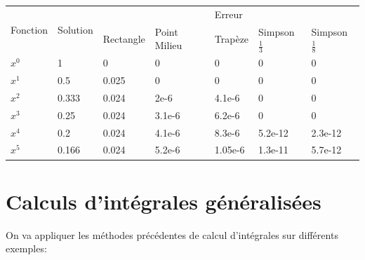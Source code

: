 \documentclass[a4paper,10pt]{article}
\begin{document}
\begin{enumerate}
{\begin{center}
\begin{tabular}{|l|l|l|l|l|l|l|}
\multirow{2}{*}{Fonction} & \multirow{2}{*}{Solution} & \multicolumn{5}{c|}{Erreur} \\\cline{3-7}
      &         & Rectangle & Point Milieu & Trapèze & Simpson $\frac{1}{3}$ & Simpson $\frac{1}{8}$\\\hline
$x^0$ & 1       & 0         & 0            & 0       & 0                    & 0 \\\hline
$x^1$ & 0.5     & 0.025     & 0            & 0       & 0                    & 0 \\\hline
$x^2$ & 0.333   & 0.024     & 2e-6         & 4.1e-6  & 0                    & 0 \\\hline
$x^3$ & 0.25    & 0.024     & 3.1e-6       & 6.2e-6  & 0                    & 0 \\\hline
$x^4$ & 0.2     & 0.024     & 4.1e-6       & 8.3e-6  & 5.2e-12              & 2.3e-12 \\\hline
$x^5$ & 0.166   & 0.024     & 5.2e-6       & 1.05e-6 & 1.3e-11              & 5.7e-12 \\\hline

\end{tabular}
\end{center}
}
\end{enumerate}

\section{Calculs d'intégrales généralisées}

On va appliquer les méthodes précédentes de calcul d'intégrales sur différents
exemples:
\end{document}
